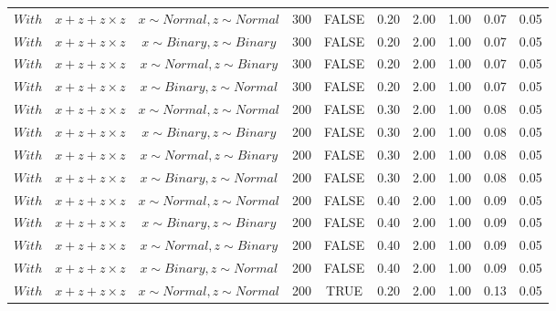 \begin{longtable}{lccccccccc}
  $With$ & $\textit{x} + \textit{z} + \textit{z} \times \textit{z}$ & $\textit{x} \sim Normal , \textit{z} \sim Normal$ & 300 & FALSE & 0.20 & 2.00 & 1.00 & 0.07 & 0.05 \\ 
  $With$ & $\textit{x} + \textit{z} + \textit{z} \times \textit{z}$ & $\textit{x} \sim Binary, \textit{z} \sim Binary$ & 300 & FALSE & 0.20 & 2.00 & 1.00 & 0.07 & 0.05 \\ 
  $With$ & $\textit{x} + \textit{z} + \textit{z} \times \textit{z}$ & $\textit{x} \sim Normal, \textit{z} \sim Binary$ & 300 & FALSE & 0.20 & 2.00 & 1.00 & 0.07 & 0.05 \\ 
  $With$ & $\textit{x} + \textit{z} + \textit{z} \times \textit{z}$ & $\textit{x} \sim Binary, \textit{z} \sim Normal$ & 300 & FALSE & 0.20 & 2.00 & 1.00 & 0.07 & 0.05 \\ 
  $With$ & $\textit{x} + \textit{z} + \textit{z} \times \textit{z}$ & $\textit{x} \sim Normal , \textit{z} \sim Normal$ & 200 & FALSE & 0.30 & 2.00 & 1.00 & 0.08 & 0.05 \\ 
  $With$ & $\textit{x} + \textit{z} + \textit{z} \times \textit{z}$ & $\textit{x} \sim Binary, \textit{z} \sim Binary$ & 200 & FALSE & 0.30 & 2.00 & 1.00 & 0.08 & 0.05 \\ 
  $With$ & $\textit{x} + \textit{z} + \textit{z} \times \textit{z}$ & $\textit{x} \sim Normal, \textit{z} \sim Binary$ & 200 & FALSE & 0.30 & 2.00 & 1.00 & 0.08 & 0.05 \\ 
  $With$ & $\textit{x} + \textit{z} + \textit{z} \times \textit{z}$ & $\textit{x} \sim Binary, \textit{z} \sim Normal$ & 200 & FALSE & 0.30 & 2.00 & 1.00 & 0.08 & 0.05 \\ 
  $With$ & $\textit{x} + \textit{z} + \textit{z} \times \textit{z}$ & $\textit{x} \sim Normal , \textit{z} \sim Normal$ & 200 & FALSE & 0.40 & 2.00 & 1.00 & 0.09 & 0.05 \\ 
  $With$ & $\textit{x} + \textit{z} + \textit{z} \times \textit{z}$ & $\textit{x} \sim Binary, \textit{z} \sim Binary$ & 200 & FALSE & 0.40 & 2.00 & 1.00 & 0.09 & 0.05 \\ 
  $With$ & $\textit{x} + \textit{z} + \textit{z} \times \textit{z}$ & $\textit{x} \sim Normal, \textit{z} \sim Binary$ & 200 & FALSE & 0.40 & 2.00 & 1.00 & 0.09 & 0.05 \\ 
  $With$ & $\textit{x} + \textit{z} + \textit{z} \times \textit{z}$ & $\textit{x} \sim Binary, \textit{z} \sim Normal$ & 200 & FALSE & 0.40 & 2.00 & 1.00 & 0.09 & 0.05 \\ 
  $With$ & $\textit{x} + \textit{z} + \textit{z} \times \textit{z}$ & $\textit{x} \sim Normal , \textit{z} \sim Normal$ & 200 & TRUE & 0.20 & 2.00 & 1.00 & 0.13 & 0.05 \\ 

\end{longtable}
